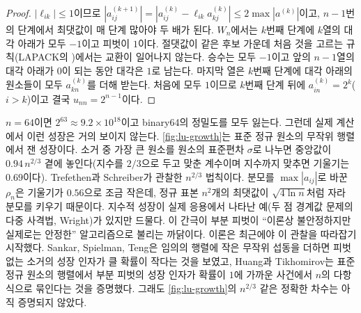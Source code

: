 \begin{proof}
$|\ell_{ik}|\le1$이므로 $|a^{(k+1)}_{ij}|=|a^{(k)}_{ij}-\ell_{ik}a^{(k)}_{kj}|\le2\max|a^{(k)}|$이고, $n-1$번의 단계에서 최댓값이 매 단계 많아야 두 배가 된다. $W_n$에서는 $k$번째 단계에 $k$열의 대각 아래가 모두 $-1$이고 피벗이 $1$이다. 절댓값이 같은 후보 가운데 처음 것을 고르는 규칙(LAPACK의 )에서는 교환이 일어나지 않는다. 승수는 모두 $-1$이고 앞의 $n-1$열의 대각 아래가 $0$이 되는 동안 대각은 $1$로 남는다. 마지막 열은 $k$번째 단계에 대각 아래의 원소들이 모두 $a_{kn}^{(k)}$를 더해 받는다. 처음에 모두 $1$이므로 $k$번째 단계 뒤에 $a^{(k)}_{in}=2^{k}$($i>k$)이고 결국 $u_{nn}=2^{n-1}$이다.
\end{proof}

$n=64$이면 $2^{63}\approx9.2\times10^{18}$이고 binary64의 정밀도를 모두 잃는다. 그런데 실제 계산에서 이런 성장은 거의 보이지 않는다. \cref{fig:lu-growth}는 표준 정규 원소의 무작위 행렬에서 잰 성장이다. 소거 중 가장 큰 원소를 원소의 표준편차 $\sigma$로 나누면 중앙값이 $0.94\,n^{2/3}$ 곁에 놓인다(지수를 $2/3$으로 두고 맞춘 계수이며 지수까지 맞추면 기울기는 $0.69$이다). Trefethen과 Schreiber가 관찰한 $n^{2/3}$ 법칙이다\cite{trefethen1990average}. 분모를 $\max|a_{ij}|$로 바꾼 $\rho_n$은 기울기가 $0.56$으로 조금 작은데, 정규 표본 $n^2$개의 최댓값이 $\sqrt{4\ln n}$처럼 자라 분모를 키우기 때문이다. 지수적 성장이 실제 응용에서 나타난 예(두 점 경계값 문제의 다중 사격법, Wright\cite{wright1993})가 있지만 드물다. 이 간극이 부분 피벗이 ``이론상 불안정하지만 실제로는 안정한'' 알고리즘으로 불리는 까닭이다. 이론은 최근에야 이 관찰을 따라잡기 시작했다. Sankar, Spielman, Teng은 임의의 행렬에 작은 무작위 섭동을 더하면 피벗 없는 소거의 성장 인자가 클 확률이 작다는 것을 보였고\cite{sankar2006smoothed}, Huang과 Tikhomirov는 표준 정규 원소의 행렬에서 부분 피벗의 성장 인자가 확률이 $1$에 가까운 사건에서 $n$의 다항식으로 묶인다는 것을 증명했다\cite{huang2024average}. 그래도 \cref{fig:lu-growth}의 $n^{2/3}$ 같은 정확한 차수는 아직 증명되지 않았다.

